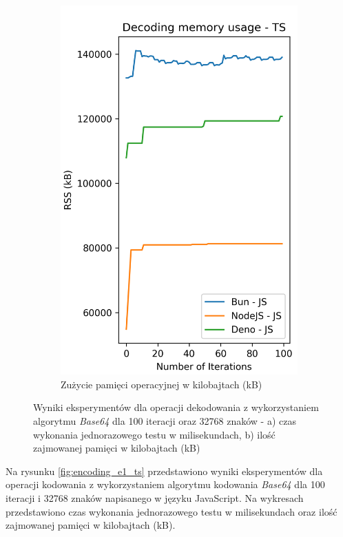 \begin{figure}[H]
\begin{subfigure}[b]{0.42\textwidth}
    \includegraphics[width=\textwidth]{Figures/coding/base64_100_decoding_js_memory.png}
    \caption{Zużycie pamięci operacyjnej w kilobajtach (kB)}
    \label{fig:decoding_e1_js_memory}
  \end{subfigure}
  \hfill
  \caption{Wyniki eksperymentów dla operacji dekodowania z wykorzystaniem algorytmu \textit{Base64} dla 100 iteracji oraz 32768 znaków - a) czas wykonania jednorazowego testu w milisekundach, b) ilość zajmowanej pamięci w kilobajtach (kB)}
  \label{fig:decoding_e1_js}
\end{figure}

Na rysunku \ref{fig:encoding_e1_ts} przedstawiono wyniki eksperymentów dla operacji kodowania z wykorzystaniem algorytmu kodowania \textit{Base64} dla 100 iteracji i 32768 znaków napisanego w języku JavaScript. Na wykresach przedstawiono czas wykonania jednorazowego testu w milisekundach oraz ilość zajmowanej pamięci w kilobajtach (kB).


